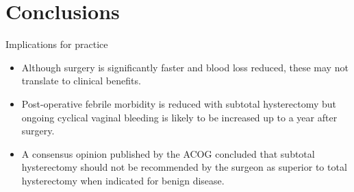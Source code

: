 \documentclass{beamer}
\begin{document}
\section{Conclusions}
\begin{frame}{Implications for practice}
    \begin{itemize}
        \item Although surgery is significantly faster and blood loss reduced,
              these may not translate to clinical benefits.
        \item Post-operative febrile morbidity is reduced with subtotal
              hysterectomy but ongoing cyclical vaginal bleeding is likely to
              be increased up to a year after surgery.
        \item A consensus opinion published by the ACOG concluded that subtotal
              hysterectomy should not be recommended by the surgeon as superior
              to total hysterectomy when indicated for benign disease.
    \end{itemize}
\end{frame}
\end{document}

